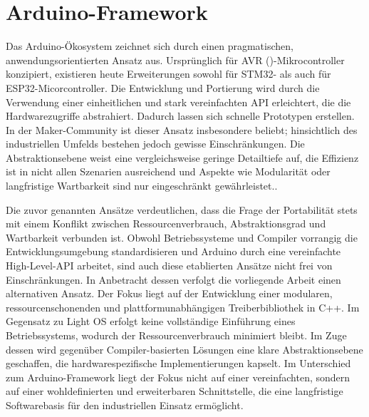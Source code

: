 \section{Arduino-Framework}
Das Arduino-Ökosystem zeichnet sich durch einen pragmatischen, anwendungsorientierten Ansatz aus.
Ursprünglich für AVR ()-Mikrocontroller konzipiert, existieren heute Erweiterungen sowohl für STM32- als auch für ESP32-Micorcontroller. 
Die Entwicklung und Portierung wird durch die Verwendung einer einheitlichen und stark vereinfachten API erleichtert, die die Hardwarezugriffe abstrahiert. 
Dadurch lassen sich schnelle Prototypen erstellen. 
In der Maker-Community ist dieser Ansatz insbesondere beliebt; hinsichtlich des industriellen Umfelds bestehen jedoch gewisse Einschränkungen.
Die Abstraktionsebene weist eine vergleichsweise geringe Detailtiefe auf, die Effizienz ist in nicht allen Szenarien ausreichend und Aspekte wie Modularität oder langfristige Wartbarkeit sind nur eingeschränkt gewährleistet.\cite{stm32duino}\cite{arduinoesp32}. 

\vspace{0.5cm}
\vspace{0.5cm}

Die zuvor genannten Ansätze verdeutlichen, dass die Frage der Portabilität stets mit einem Konflikt zwischen Ressourcenverbrauch, Abstraktionsgrad und Wartbarkeit verbunden ist. 
Obwohl Betriebssysteme und Compiler vorrangig die Entwicklungsumgebung standardisieren und Arduino durch eine vereinfachte High-Level-API arbeitet, sind auch diese etablierten Ansätze nicht frei von Einschränkungen. 
In Anbetracht dessen verfolgt die vorliegende Arbeit einen alternativen Ansatz. 
Der Fokus liegt auf der Entwicklung einer modularen, ressourcenschonenden und plattformunabhängigen Treiberbibliothek in C++. 
Im Gegensatz zu Light OS erfolgt keine vollständige Einführung eines Betriebssystems, wodurch der Ressourcenverbrauch minimiert bleibt. 
Im Zuge dessen wird gegenüber Compiler-basierten Lösungen eine klare Abstraktionsebene geschaffen, die hardwarespezifische Implementierungen kapselt.
Im Unterschied zum Arduino-Framework liegt der Fokus nicht auf einer vereinfachten, sondern auf einer wohldefinierten und erweiterbaren Schnittstelle, die eine langfristige Softwarebasis für den industriellen Einsatz ermöglicht.